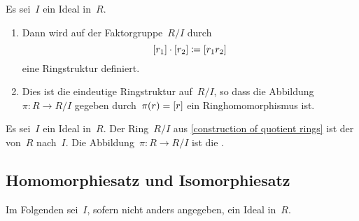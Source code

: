 \begin{lemma}
  \label{construction of quotient rings}
  Es sei~$I$ ein Ideal in~$R$.
  \begin{enumerate}
    \item
      Dann wird auf der Faktorgruppe~$R/I$ durch
      \[
        [r_1] \cdot [r_2]
        \coloneqq
        [r_1 r_2]
      \]
      eine Ringstruktur definiert.
    \item
      Dies ist die eindeutige Ringstruktur auf~$R/I$, so dass die Abbildung~$\pi \colon R \to R/I$ gegeben durch~$\pi(r) = [r]$ ein Ringhomomorphismus ist.
  \end{enumerate}
\end{lemma}

\begin{definition}
  Es sei~$I$ ein Ideal in~$R$.
  Der Ring~$R/I$ aus \cref{construction of quotient rings} ist der  von~$R$ nach~$I$.
  Die Abbildung~$\pi \colon R \to R/I$ ist die .
\end{definition}



\subsection{Homomorphiesatz und Isomorphiesatz}

\begin{convention}
  Im Folgenden sei~$I$, sofern nicht anders angegeben, ein Ideal in~$R$.
\end{convention}

